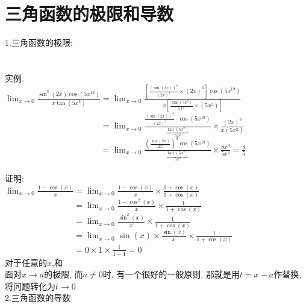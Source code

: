 \chapter{三角函数的极限和导数}
1.三角函数的极限:\\[2ex]
\\[2ex]
\\[2ex]
实例.\\
$\displaystyle\lim_{x\to 0}\frac{\sin^3(2x)\cos(5x^{19})}{x\tan(5x^2)}=\lim_{x\to 0}\frac{[\frac{(\sin(2x))^3}{(2x)^3}\times (2x)^3]\cos(5x^{19})}{x[\frac{\tan(5x^2)}{5x^2}\times (5x^2)]}$\\
$\displaystyle\phantom{\lim_{x\to 0}\frac{\sin^3(2x)\cos(5x^{19})}{x\tan(5x^2)}}=\lim_{x\to 0}\frac{\frac{(\sin(2x))^3}{(2x)^3}\cdot\cos(5x^{19})}{\frac{\tan(5x^2)}{5x^2}}\times\frac{(2x)^3}{x(5x^2)}$\\
$\displaystyle\phantom{\lim_{x\to 0}\frac{\sin^3(2x)\cos(5x^{19})}{x\tan(5x^2)}}=\lim_{x\to 0}\frac{(\frac{\sin(2x)}{2x})^3\cos(5x^{19})}{\frac{\tan(5x^2)}{5x^2}}\times\frac{8x^3}{5x^3}=\frac{8}{5}$\\[2ex]
\\[2ex]
证明:\\[2ex]
$\displaystyle\lim_{x\to 0}\frac{1-\cos(x)}{x}=\lim_{x\to 0}\frac{1-\cos(x)}{x}\times\frac{1+\cos(x)}{1+\cos(x)}$\\
$\displaystyle\phantom{\lim_{x\to 0}\frac{1-\cos(x)}{x}}=\lim_{x\to 0}\frac{1-\cos^2(x)}{x}\times\frac{1}{1+\cos(x)}$\\
$\displaystyle\phantom{\lim_{x\to 0}\frac{1-\cos(x)}{x}}=\lim_{x\to 0}\frac{\sin^2(x)}{x}\times\frac{1}{1+\cos(x)}$\\
$\displaystyle\phantom{\lim_{x\to 0}\frac{1-\cos(x)}{x}}=\lim_{x\to 0}\sin(x)\times\frac{\sin(x)}{x}\times\frac{1}{1+\cos(x)}$\\
$\displaystyle\phantom{\lim_{x\to 0}\frac{1-\cos(x)}{x}}=0\times 1\times\frac{1}{1+1}=0$\\[2ex]
对于任意的$x$,和\\[2ex]
面对$x\to a$的极限, 而$a\neq 0$时, 有一个很好的一般原则, 那就是用$t=x-a$作替换, 将问题转化为$t\to 0$\\[2ex]

2.三角函数的导数\\[2ex]
\\[2ex]
\\[2ex]
\\[2ex]
\\[2ex]
\\[2ex]
\\[2ex]
